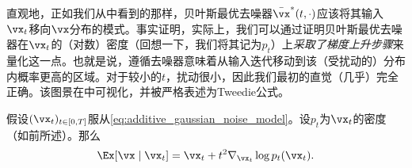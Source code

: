 \documentclass[../../book-main_zh.tex]{subfiles}
\begin{document}
直观地，正如我们从中看到的那样，贝叶斯最优去噪器\(\bar{\vx}^{\ast}(t, \cdot)\)应该将其输入\(\vx_{t}\)移向\(\vx\)分布的模式。事实证明，实际上，我们可以通过证明贝叶斯最优去噪器在\(\vx_{t}\)的（对数）密度（回想一下，我们将其记为\(p_{t}\)）上\textit{采取了梯度上升步骤}来量化这一点。也就是说，遵循去噪器意味着从输入迭代移动到该（受扰动的）分布内概率更高的区域。对于较小的\(t\)，扰动很小，因此我们最初的直觉（几乎）完全正确。该图景在中可视化，并被严格表述为Tweedie公式\cite{Robbins1956AnEB}。
\begin{theorem}[Tweedie公式]\label{thm:tweedie}
    假设\((\vx_{t})_{t \in [0, T]}\)服从\eqref{eq:additive_gaussian_noise_model}。设\(p_{t}\)为\(\vx_{t}\)的密度（如前所述）。那么
    \begin{equation}\label{eq:tweedie}
        \Ex[\vx \mid \vx_{t}] = \vx_{t} + t^{2}\nabla_{\vx_{t}} \log
        p_{t}(\vx_{t}).
    \end{equation}
\end{theorem}
\end{document}
